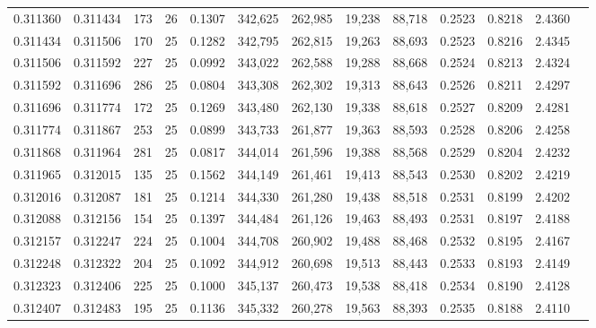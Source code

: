 \begin{tabular}{rrrrrrrrrrrrr}
0.311360 & 0.311434 &   173 &  26 &                                     0.1307 & 342,625 & 262,985 &  19,238 &  88,718 & 0.2523 & 0.8218 & 2.4360 \\
0.311434 & 0.311506 &   170 &  25 &                                     0.1282 & 342,795 & 262,815 &  19,263 &  88,693 & 0.2523 & 0.8216 & 2.4345 \\
0.311506 & 0.311592 &   227 &  25 &                                     0.0992 & 343,022 & 262,588 &  19,288 &  88,668 & 0.2524 & 0.8213 & 2.4324 \\
0.311592 & 0.311696 &   286 &  25 &                                     0.0804 & 343,308 & 262,302 &  19,313 &  88,643 & 0.2526 & 0.8211 & 2.4297 \\
0.311696 & 0.311774 &   172 &  25 &                                     0.1269 & 343,480 & 262,130 &  19,338 &  88,618 & 0.2527 & 0.8209 & 2.4281 \\
0.311774 & 0.311867 &   253 &  25 &                                     0.0899 & 343,733 & 261,877 &  19,363 &  88,593 & 0.2528 & 0.8206 & 2.4258 \\
0.311868 & 0.311964 &   281 &  25 &                                     0.0817 & 344,014 & 261,596 &  19,388 &  88,568 & 0.2529 & 0.8204 & 2.4232 \\
0.311965 & 0.312015 &   135 &  25 &                                     0.1562 & 344,149 & 261,461 &  19,413 &  88,543 & 0.2530 & 0.8202 & 2.4219 \\
0.312016 & 0.312087 &   181 &  25 &                                     0.1214 & 344,330 & 261,280 &  19,438 &  88,518 & 0.2531 & 0.8199 & 2.4202 \\
0.312088 & 0.312156 &   154 &  25 &                                     0.1397 & 344,484 & 261,126 &  19,463 &  88,493 & 0.2531 & 0.8197 & 2.4188 \\
0.312157 & 0.312247 &   224 &  25 &                                     0.1004 & 344,708 & 260,902 &  19,488 &  88,468 & 0.2532 & 0.8195 & 2.4167 \\
0.312248 & 0.312322 &   204 &  25 &                                     0.1092 & 344,912 & 260,698 &  19,513 &  88,443 & 0.2533 & 0.8193 & 2.4149 \\
0.312323 & 0.312406 &   225 &  25 &                                     0.1000 & 345,137 & 260,473 &  19,538 &  88,418 & 0.2534 & 0.8190 & 2.4128 \\
0.312407 & 0.312483 &   195 &  25 &                                     0.1136 & 345,332 & 260,278 &  19,563 &  88,393 & 0.2535 & 0.8188 & 2.4110 \\

\end{tabular}
